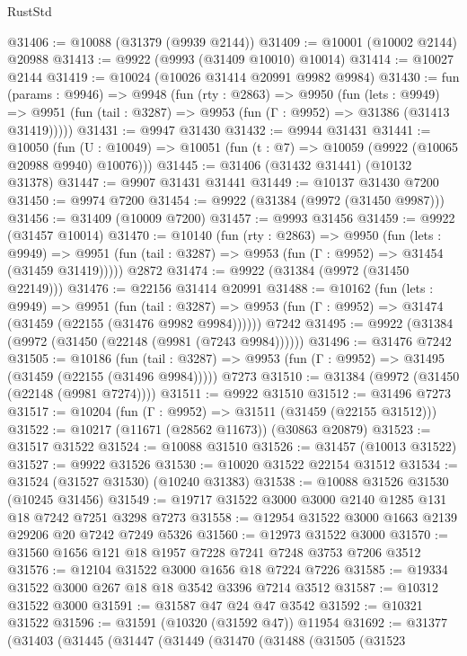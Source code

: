 \begin{lexlean}{RustStd}
\begin{coremodule}
@31406 := @10088 (@31379 (@9939 @2144))
@31409 := @10001 (@10002 @2144) @20988
@31413 := @9922 (@9993 (@31409 @10010) @10014)
@31414 := @10027 @2144
@31419 := @10024 (@10026 @31414 @20991 @9982 @9984)
@31430 := fun (params : @9946) =>
  @9948
    (fun (rty : @2863) =>
    @9950
      (fun (lets : @9949) =>
      @9951 (fun (tail : @3287) => @9953 (fun (Γ : @9952) => @31386 (@31413 @31419)))))
@31431 := @9947 @31430
@31432 := @9944 @31431
@31441 := @10050
    (fun (U : @10049) => @10051 (fun (t : @7) => @10059 (@9922 (@10065 @20988 @9940) @10076)))
@31445 := @31406 (@31432 @31441) (@10132 @31378)
@31447 := @9907 @31431 @31441
@31449 := @10137 @31430 @7200
@31450 := @9974 @7200
@31454 := @9922 (@31384 (@9972 (@31450 @9987)))
@31456 := @31409 (@10009 @7200)
@31457 := @9993 @31456
@31459 := @9922 (@31457 @10014)
@31470 := @10140
    (fun (rty : @2863) =>
    @9950
      (fun (lets : @9949) =>
      @9951 (fun (tail : @3287) => @9953 (fun (Γ : @9952) => @31454 (@31459 @31419)))))
    @2872
@31474 := @9922 (@31384 (@9972 (@31450 @22149)))
@31476 := @22156 @31414 @20991
@31488 := @10162
    (fun (lets : @9949) =>
    @9951
      (fun (tail : @3287) =>
      @9953 (fun (Γ : @9952) => @31474 (@31459 (@22155 (@31476 @9982 @9984))))))
    @7242
@31495 := @9922 (@31384 (@9972 (@31450 (@22148 (@9981 (@7243 @9984))))))
@31496 := @31476 @7242
@31505 := @10186
    (fun (tail : @3287) => @9953 (fun (Γ : @9952) => @31495 (@31459 (@22155 (@31496 @9984)))))
    @7273
@31510 := @31384 (@9972 (@31450 (@22148 (@9981 @7274))))
@31511 := @9922 @31510
@31512 := @31496 @7273
@31517 := @10204 (fun (Γ : @9952) => @31511 (@31459 (@22155 @31512)))
@31522 := @10217 (@11671 (@28562 @11673)) (@30863 @20879)
@31523 := @31517 @31522
@31524 := @10088 @31510
@31526 := @31457 (@10013 @31522)
@31527 := @9922 @31526
@31530 := @10020 @31522 @22154 @31512
@31534 := @31524 (@31527 @31530) (@10240 @31383)
@31538 := @10088 @31526 @31530 (@10245 @31456)
@31549 := @19717 @31522 @3000 @3000 @2140 @1285 @131 @18 @7242 @7251 @3298 @7273
@31558 := @12954 @31522 @3000 @1663 @2139 @29206 @20 @7242 @7249 @5326
@31560 := @12973 @31522 @3000
@31570 := @31560 @1656 @121 @18 @1957 @7228 @7241 @7248 @3753 @7206 @3512
@31576 := @12104 @31522 @3000 @1656 @18 @7224 @7226
@31585 := @19334 @31522 @3000 @267 @18 @18 @3542 @3396 @7214 @3512
@31587 := @10312 @31522 @3000
@31591 := @31587 @47 @24 @47 @3542
@31592 := @10321 @31522
@31596 := @31591 (@10320 (@31592 @47)) @11954
@31692 := @31377
    (@31403
      (@31445
        (@31447
          (@31449
            (@31470
              (@31488
                (@31505
                  (@31523

\end{coremodule}
\end{lexlean}
